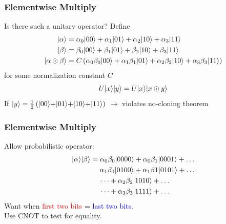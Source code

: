 \documentclass[
	11pt, %
]{beamer}
\begin{document}

\begin{frame}
    \frametitle{Elementwise Multiply}
    Is there such a unitary operator? Define
    \begin{align*}
        \rvert\alpha\rangle             & = \alpha_0\rvert00\rangle + \alpha_1\rvert01\rangle + \alpha_2\rvert10\rangle + \alpha_3\rvert11\rangle                                           \\
        \rvert\beta\rangle              & = \beta_0\rvert00\rangle + \beta_1\rvert01\rangle + \beta_2\rvert10\rangle + \beta_3\rvert11\rangle                                               \\
        \rvert\alpha \odot \beta\rangle & = C\left(\alpha_0\beta_0\rvert00\rangle + \alpha_1\beta_1\rvert01\rangle + \alpha_2\beta_2\rvert10\rangle + \alpha_3\beta_3\rvert11\rangle\right)
    \end{align*}
    for some normalization constant $C$
    \[
        U\rvert x\rangle\rvert y\rangle = U\rvert x\rangle\rvert x \odot y\rangle
    \]
    If $\rvert y\rangle = \frac{1}{2} \left(\rvert00\rangle + \rvert01\rangle + \rvert10\rangle + \rvert11\rangle\right)$ $\longrightarrow$ violates \alert{no-cloning theorem}
\end{frame}


\begin{frame}
    \frametitle{Elementwise Multiply}
    Allow probabilistic operator:
    \begin{align*}
        \rvert\alpha\rangle\rvert\beta\rangle & = \alpha_0\beta_0 \rvert0000\rangle + \alpha_0\beta_1\rvert0001\rangle + \dots               \\
                                & \hspace{0.45cm} \alpha_1\beta_0\rvert0100\rangle + \alpha_1\beta{1}\rvert0101\rangle + \dots \\
                                & \hspace{0.45cm} \dots + \alpha_2\beta_2\rvert1010\rangle + \dots                      \\
                                & \hspace{0.45cm} \dots + \alpha_3\beta_3\rvert1111\rangle + \dots
    \end{align*}
    Want when \textcolor{red}{first two bits} = \textcolor{blue}{last two bits}.\\
    \bigskip
    Use CNOT to test for equality.
\end{frame}

\end{document}
